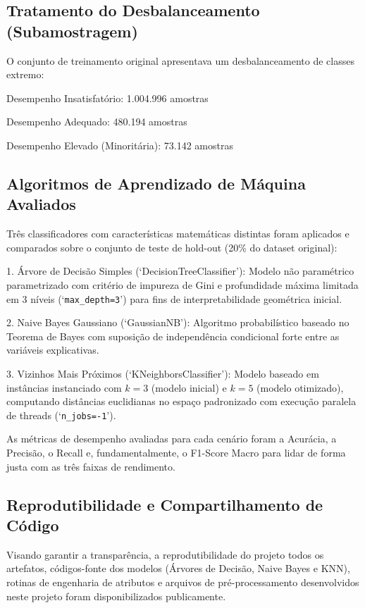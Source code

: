 \documentclass[12pt]{article}
\begin{document}
\subsection{Tratamento do Desbalanceamento (Subamostragem)}

O conjunto de treinamento original apresentava um desbalanceamento de classes extremo:

Desempenho Insatisfatório: 1.004.996 amostras

Desempenho Adequado: 480.194 amostras

Desempenho Elevado (Minoritária): 73.142 amostras

\subsection{Algoritmos de Aprendizado de Máquina Avaliados}

Três classificadores com características matemáticas distintas foram aplicados e comparados sobre o conjunto de teste de hold-out (20\% do dataset original):

1. Árvore de Decisão Simples (`DecisionTreeClassifier'): Modelo não paramétrico parametrizado com critério de impureza de Gini e profundidade máxima limitada em 3 níveis (`\texttt{max\_depth=3}') para fins de interpretabilidade geométrica inicial.

2. Naive Bayes Gaussiano (`GaussianNB'): Algoritmo probabilístico baseado no Teorema de Bayes com suposição de independência condicional forte entre as variáveis explicativas.

3. Vizinhos Mais Próximos (`KNeighborsClassifier'): Modelo baseado em instâncias instanciado com $k=3$ (modelo inicial) e $k=5$ (modelo otimizado), computando distâncias euclidianas no espaço padronizado com execução paralela de threads (`\texttt{n\_jobs=-1}').

As métricas de desempenho avaliadas para cada cenário foram a Acurácia, a Precisão, o Recall e, fundamentalmente, o F1-Score Macro para lidar de forma justa com as três faixas de rendimento.

\subsection{Reprodutibilidade e Compartilhamento de Código}

Visando garantir a transparência, a reprodutibilidade do projeto todos os artefatos, códigos-fonte dos modelos (Árvores de Decisão, Naive Bayes e KNN), rotinas de engenharia de atributos e arquivos de pré-processamento desenvolvidos neste projeto foram disponibilizados publicamente.
\end{document}
